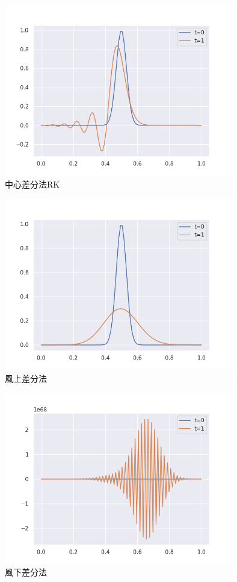 \documentclass{jsarticle}
\begin{document}
\begin{figure}[H]
    \includegraphics[clip,width=10.0cm]{./adv_center_rk.png}
    \caption{中心差分法RK}
    \label{fig:7}
\end{figure}

\begin{figure}[H]
    \includegraphics[clip,width=10.0cm]{./adv_upwind_rk.png}
    \caption{風上差分法}
    \label{fig:8}
\end{figure}

\begin{figure}[H]
    \includegraphics[clip,width=10.0cm]{./adv_downwind_rk.png}
    \caption{風下差分法}
    \label{fig:9}
\end{figure}
\end{document}
